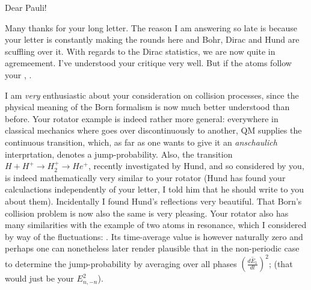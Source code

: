 \date{October 28, 1926}

Dear Pauli!

Many thanks for your long letter. The reason I am answering so late is because your letter is constantly making the rounds here and Bohr, Dirac and Hund are scuffling over it. With regards to the Dirac statistics, we are now quite in agremeement. I've understood your critique very well. But if the atoms follow your , .

I am \textit{very} enthusiastic about your consideration on collision processes, since the physical meaning of the Born formalism is now much better understood than before. Your rotator example is indeed rather more general: everywhere in classical mechanics where  goes over discontinuously to another, QM supplies the continuous transition, which, as far as one wants to give it an \textit{anschaulich} interprtation, denotes a jump-probability. Also, the transition $H + H^+ \to H^+_2 \to He^+$, recently investigated by Hund, and so  considered by you, is indeed mathematically very similar to your rotator (Hund has found your calculactions independently of your letter, I told him that he should write to you about them). Incidentally I found Hund's reflections very beautiful. That Born's collision problem is now also the same is very pleasing. Your rotator also has many similarities with the example of two atoms in resonance, which I considered by way of the fluctuations: . Its time-average value is however naturally zero and perhaps one can nonetheless later render plausible that in the non-periodic case to determine the jump-probability by averaging over all phases $\left(\overline{\frac{dE_1}{dt}}\right)^2$; (that would just be your $E^2_{n,-n}$).

